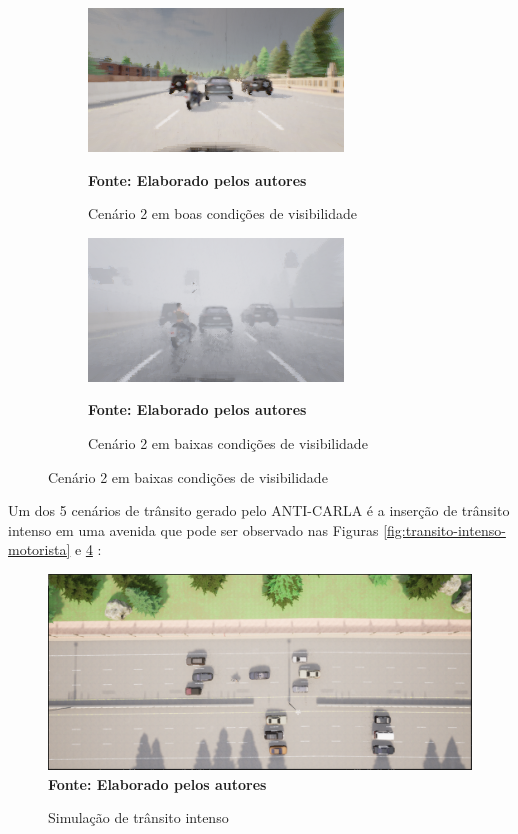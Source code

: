 \documentclass[a4paper,12pt,Times]{article}
\begin{document}
\begin{figure}[H]
\caption{Imagens do cenário 2 gerada pelo ANTI-CARLA}
\centering
\label{fig:transito-intenso-motorista}
\begin{subfigure}{0.45\textwidth}
    \centering
    \includegraphics[scale=0.77]{figuras/simulacao-boa-4.png}
    \captionsetup{justification=centering}
    \caption{Cenário 2 em boas condições de visibilidade}
    \label{fig:boa-2}
    \vspace{-0.2cm}
    \textbf{\footnotesize Fonte: Elaborado pelos autores}
\end{subfigure}
\hfill
\begin{subfigure}{0.45\textwidth}
    \centering
    \includegraphics[scale=0.77]{figuras/simulacao-ruim-4.png}
    \captionsetup{justification=centering}
    \caption{Cenário 2 em baixas condições de visibilidade}
    \label{fig:ruim-2}
    \vspace{-0.2cm}
    \textbf{\footnotesize Fonte: Elaborado pelos autores}
\end{subfigure}

\end{figure}

Um dos 5 cenários de trânsito gerado pelo ANTI-CARLA é a inserção de trânsito intenso em uma avenida que pode ser observado nas Figuras \ref{fig:transito-intenso-motorista} e \ref{fig:transito_intenso} :

\begin{figure}[H]
  \centering
  \caption{Simulação de trânsito intenso}
  \includegraphics[scale=0.3]{figuras/transito intenso.png}\captionsetup{justification=centering}
\vspace{-0.2cm}
   \\\textbf{\footnotesize Fonte: Elaborado pelos autores}
  \label{fig:transito_intenso}
\end{figure}
\end{document}
